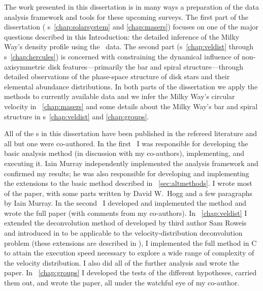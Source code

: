 The work presented in this dissertation is in many ways a preparation
of the data analysis framework and tools for these upcoming
surveys. The first part of the dissertation (\chaptername
s~\ref{chap:solarsystem} and \ref{chap:masers}) focuses on one
of the major questions described in this Introduction: the detailed
inference of the Milky Way's density profile using the \Gaia\
data. The second part (\chaptername s~\ref{chap:veldist}
through \chaptername s~\ref{chap:hercules}) is concerned with
constraining the dynamical influence of non-axisymmetric disk
features---primarily the bar and spiral structure---through detailed
observations of the phase-space structure of disk stars and their
elemental abundance distributions. In both parts of the dissertation
we apply the methods to currently available data and we infer the
Milky Way's circular velocity in \chaptername~\ref{chap:masers} and
some details about the Milky Way's bar and spiral structure
in \chaptername s~\ref{chap:veldist} and \ref{chap:groups}. 

All of the \chaptername s in this dissertation have been published in
the refereed literature and all but one were co-authored. In the
first \chaptername\ I was responsible for developing the basic
analysis method (in discussion with my co-authors), implementing, and
executing it. Iain Murray independently implemented the analysis
framework and confirmed my results; he was also responsible for
developing and implementing the extensions to the basic method
described in \sectionname~\ref{sec:altmethods}. I wrote most of the
paper, with some parts written by David W.~Hogg and a few paragraphs
by Iain Murray. In the second \chaptername\ I developed and
implemented the method and wrote the full paper (with comments from my
co-authors). In \chaptername~\ref{chap:veldist} I extended the
deconvolution method of developed by third author Sam Roweis and
introduced in \citet{2005ApJ...629..268H} to be applicable to the
velocity-distribution deconvolution problem (these extensions are
described in \citealt{BovyXD}), I implemented the full method in C to
attain the execution speed necessary to explore a wide range of
complexity of the velocity distribution. I also did all of the further
analysis and wrote the paper. In \chaptername~\ref{chap:groups} I
developed the tests of the different hypotheses, carried them out, and
wrote the paper, all under the watchful eye of my co-author.
